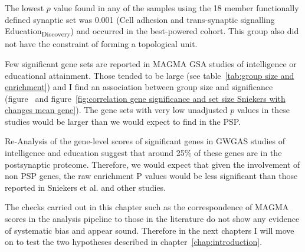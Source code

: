 The lowest $p$ value found in any of the samples using the 18 member functionally defined synaptic set was 0.001 (Cell adhesion and trans-synaptic signalling Education\textsubscript{Discovery}) and occurred in the best-powered cohort. This group also did not have the constraint of forming a topological unit.

 Few significant gene sets are reported in MAGMA GSA studies of intelligence or educational attainment. Those tended to be large (see table~\ref{tab:group size and enrichment}) and I find an association between group size and significance (figure~\label{fig:correlation gene significance and set size Sniekers} and figure~\ref{fig:correlation gene significance and set size Sniekers with changes mean gene}). The gene sets with very low unadjusted $p$ values in these studies would be larger than we would expect to find in the PSP.

Re-Analysis of the gene-level scores of significant genes in GWGAS studies of intelligence and education suggest that around 25\% of these genes are in the postsynaptic proteome. Therefore, we would expect that given the involvement of non PSP genes, the raw enrichment P values would be less significant than those reported in Sniekers et al. and other studies. 

The checks carried out in this chapter such as the correspondence of MAGMA scores in the analysis pipeline to those in the literature do not show any evidence of systematic bias and appear sound. Therefore in the next chapters I will move on to test the two hypotheses described in chapter~\ref{chap:introduction}. 




